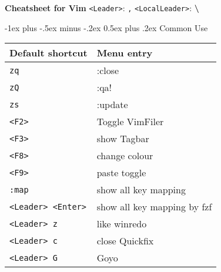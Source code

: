 \documentclass[10pt,landscape]{article}
\makeatletter
\renewcommand{\section}{\@startsection{section}{1}{0mm}%
                                {-1ex plus -.5ex minus -.2ex}%
                                {0.5ex plus .2ex}%
                                {\normalfont\large\bfseries}}
\renewcommand{\title}[1]{{\normalfont\sffamily\huge\bfseries #1}\vspace{1ex}}
\def\leader{<Leader>}
\def\locleader{<LocalLeader>}
\makeatother
\begin{document}
\raggedright
\title{Cheatsheet for Vim}
\hskip 3cm {\tt \leader}: {\tt ,} \hskip 1cm {\tt \locleader}: {\textbf{\textbackslash}}%
\newlength{\MyLen}


\begin{multicols}{3}
\section{Common Use}
\begin{tabular}{@{}p{\the\MyLen}@{}p{\linewidth-\the\MyLen}@{}}
    \hline \hline
   Default shortcut   & Menu entry       \\
   \hline
   \verb|zq|          & :close          \\
   \verb|zQ|          & :qa!            \\
   \verb|zs|          & :update         \\
   \hline
   \verb|<F2>|        & Toggle VimFiler       \\
   \verb|<F3>|        & show Tagbar           \\
   \verb|<F8>|        & change colour           \\
   \verb|<F9>|        & paste toggle           \\
   \hline
   \verb|:map|        & show all key mapping           \\
   \verb|<Leader> <Enter>| & show all key mapping by fzf \\
   \hline
   \verb|<Leader> z|  & like winredo   \\
   \verb|<Leader> c|  & close Quickfix \\
   \hline
   \verb|<Leader> G|  & Goyo           \\
    \hline \hline
\end{tabular}
\vfill


\end{multicols}
\end{document}
